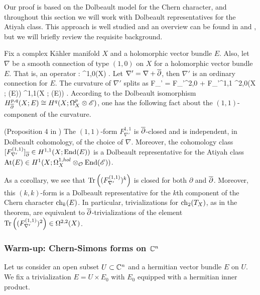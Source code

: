 Our proof is based on the Dolbeault model for the Chern character, and
throughout this section we will work with Dolbeault representatives for the Atiyah class. 
This approach is well studied and an overview can be found in \cite{atiyah} and \cite{kapranov1999}, 
but we will briefly review the requisite background.

Fix a complex K\"ahler manifold $X$ and a holomorphic vector bundle $E$. 
Also, let $\nabla$ be a smooth connection of type $(1,0)$ on $X$ for a
holomorphic vector bundle $E$. That is, an operator
\ben
\nabla : \sE \to \Omega^{1,0}(X) \tensor \sE .
\een
Let $\nabla ' = \nabla + \overline{\partial}$, then $\nabla'$ is an ordinary
connection for $E$. The curvature of $\nabla '$ splits as
\ben
F_{\nabla'} = F_{\nabla '}^{2,0} + F_{\nabla '}^{1,1} \in \Omega^{2,0}(X
; \End(E)) \oplus \Omega^{1,1}(X ; \End(E)) .
\een 
According to the Dolbeault isomorphism 
$H^{p,q}_{\overline{\partial}} (X ; E) \cong H^q(X ;  \Omega^p_X \otimes \mathscr E)$, 
one has the following fact about the $(1,1)$-component of the curvature. 

\begin{prop} (Proposition 4 in \cite{atiyah})
The $(1,1)$-form $F_{\nabla'}^{1,1}$ is $\overline{\partial}$-closed  and is independent, in Dolbeault cohomology, of the choice of $\nabla$. 
Moreover, the cohomology class $[F_{\nabla'}^{(1,1)}]_{\overline{\partial}} \in H^{1,1}(X ; {\rm End}(E))$ is a Dolbeault representative for the Atiyah class ${\rm At}(E) \in H^1(X ; \Omega^{1,hol}_X \otimes_{\mathcal O} {\rm End}(\mathscr E))$.
\end{prop}

As a corollary, we see that $\Tr \left((F_{\nabla'}^{(1,1)})^k\right)$ is closed for both $\partial$ and $\overline{\partial}$. 
Moreover, this $(k,k)$-form is a Dolbeault representative for the
$k$th component of the Chern character ${\rm ch}_k(E)$. In particular, trivializations for ${\rm ch}_2(T_X)$, as in the theorem, 
are equivalent to $\overline{\partial}$-trivializations of the element
$\Tr\left( (F_{\nabla '}^{(1,1)})^2 \right) \in \Omega^{2,2}(X)$. 

\subsubsection{Warm-up: Chern-Simons forms on $\mathbb C^n$}

\def\CS{{\rm CS}}
\def\Tr{{\rm Tr}}

Let us consider an open subset $U \subset \mathbb C^n$ and a hermitian vector
bundle $E$ on $U$. We fix a trivialization $E = U \times E_0$ with $E_0$
equipped with a hermitian inner product. 

